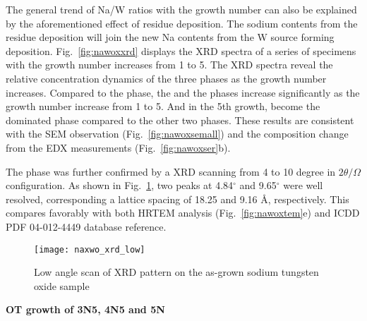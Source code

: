 The general trend of Na/W ratios with the growth number can also be explained by the aforementioned effect of residue deposition. The sodium contents from the residue deposition will join the new Na contents from the W source forming deposition. Fig.~\ref{fig:nawoxxrd} displays the XRD spectra of a series of specimens with the growth number increases from 1 to 5. The XRD spectra reveal the relative concentration dynamics of the three phases as the growth number increases. Compared to the  phase, the  and the  phases increase significantly as the growth number increase from 1 to 5. And in the 5th growth,  become the dominated phase compared to the other two phases. These results are consistent with the SEM observation (Fig.~\ref{fig:nawoxsemall}) and the composition change from the EDX measurements (Fig.~\ref{fig:nawoxser}b).

The  phase was further confirmed by a XRD scanning from 4 to 10 degree in $2\theta/\Omega$ configuration. As shown in Fig.~\ref{fig:naxrdlow}, two peaks at 4.84$^{\circ}$ and 9.65$^{\circ}$ were well resolved, corresponding a lattice spacing of 18.25 and 9.16 \AA, respectively. This compares favorably with both HRTEM analysis (Fig.~\ref{fig:nawoxtem}e) and ICDD PDF 04-012-4449 database reference. 

\begin{figure}[htb]
\centering
\texttt{[image: naxwo\_xrd\_low]}
\caption[low angle scan of XRD pattern]{Low angle scan of XRD pattern on the as-grown sodium tungsten oxide sample}
\label{fig:naxrdlow}
\end{figure}


\textbf{OT growth of 3N5, 4N5 and 5N}

